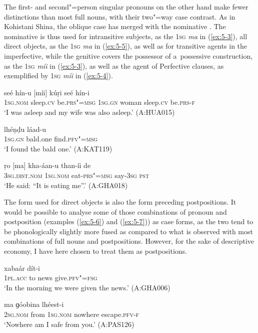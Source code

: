 The first- and second"=person singular pronouns on the other hand make fewer distinctions than most full nouns, with their two"=way case contrast. As in Kohistani Shina, the oblique case has merged with the nominative \citep[82]{schmidtkohistani2008}. The nominative is thus used for intransitive subjects, as the \textsc{1sg} \textit{ma} in (\ref{ex:5-3}), all direct objects, as the \textsc{1sg} \textit{ma} in (\ref{ex:5-5}), as well as for transitive agents in the imperfective, while the genitive covers the possessor of a~possessive construction, as the \textsc{1sg} \textit{míi} in (\ref{ex:5-3}), as well as the agent of Perfective clauses, as exemplified by \textsc{1sg} \textit{míi} in (\ref{ex:5-4}). 


\begin{exe}
\ex
\label{ex:5-3}
\gll [ma] seé hín-u [míi] kúṛi seé hín-i \\
	\textsc{1sg.nom} sleep.\textsc{cv} be.\textsc{prs"=msg} \textsc{1sg.gn} woman sleep.\textsc{cv} be.\textsc{prs-f} \\
\glt `I was asleep and my wife was also asleep.' (A:HUA015)

\ex
\label{ex:5-4}
\gll [míi] lhéṇḍu láad-u \\
	\textsc{1sg.gn} bald.one find.\textsc{pfv"=msg} \\
\glt `I found the bald one.' (A:KAT119)

\ex
\label{ex:5-5}
\gll ṛo [ma] kha-áan-u than-íi de \\
	\textsc{3sg.dist.nom} \textsc{1sg.nom} eat-\textsc{prs"=msg} say-\textsc{3sg} \textsc{pst} \\
\glt `He said: ``It is eating me''.' (A:GHA018)
\end{exe}

The form used for direct objects is also the form preceding postpositions. It would be possible to analyse some of those combinations of pronoun and postposition (examples (\ref{ex:5-6}) and (\ref{ex:5-7})) as case forms, as the two tend to be phonologically slightly more fused as compared to what is observed with most combinations of full nouns and postpositions. However, for the sake of descriptive economy, I have here chosen to treat them as postpositions. 

\begin{exe}
\ex
\label{ex:5-6}
 xabaár dít-i \\
	1\textsc{pl}.\textsc{acc} to news give.\textsc{pfv"=fsg} \\
\glt `In the morning we were given the news.' (A:GHA006)

\ex
\label{ex:5-7}
\gll [tu díi] ma ɡóobina lhéest-i \\
\textsc{2sg.nom} from \textsc{1sg.nom} nowhere escape.\textsc{pfv-f} \\
\glt `Nowhere am I safe from you.' (A:PAS126)
\end{exe}

